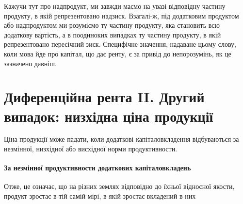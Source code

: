 Кажучи тут про надпродукт, ми завжди маємо на увазі відповідну
частину продукту, в якій репрезентовано надзиск. Взагалі-ж, під додатковим
продуктом або надпродуктом ми розуміємо ту частину продукту, яка становить
всю додаткову вартість, а в поодиноких випадках ту частину продукту, в якій
репрезентовано пересічний зиск. Специфічне значення, надаване цьому слову,
коли мова йде про капітал, що дає ренту, є за привід до непорозумінь, як це
зазначено давніш.

\section{Диференційна рента II. Другий випадок: низхідна ціна продукції}

Ціна продукції може падати, коли додаткові капіталовкладення відбуваються
за незмінної, низхідної або висхідної норми продуктивности.

\paragraph{За незмінної продуктивности додаткових капіталовкладень}

Отже, це означає, що на різних землях відповідно до їхньої відносної
якости, продукт зростає в тій самій мірі, в якій зростає вкладений в них
\parbreak{}  %
